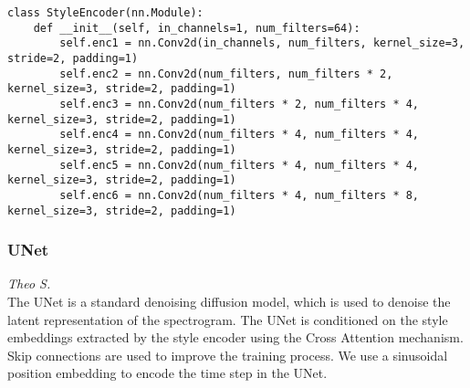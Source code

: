 \begin{lstlisting}[basicstyle=\tiny]
class StyleEncoder(nn.Module):
    def __init__(self, in_channels=1, num_filters=64):
        self.enc1 = nn.Conv2d(in_channels, num_filters, kernel_size=3, stride=2, padding=1)
        self.enc2 = nn.Conv2d(num_filters, num_filters * 2, kernel_size=3, stride=2, padding=1)
        self.enc3 = nn.Conv2d(num_filters * 2, num_filters * 4, kernel_size=3, stride=2, padding=1)
        self.enc4 = nn.Conv2d(num_filters * 4, num_filters * 4, kernel_size=3, stride=2, padding=1)
        self.enc5 = nn.Conv2d(num_filters * 4, num_filters * 4, kernel_size=3, stride=2, padding=1)
        self.enc6 = nn.Conv2d(num_filters * 4, num_filters * 8, kernel_size=3, stride=2, padding=1)
\end{lstlisting}

\subsubsection{UNet}
\textit{Theo S.}\\
The UNet is a standard denoising diffusion model, which is used to denoise the latent representation of the spectrogram. The UNet is conditioned on the style embeddings extracted by the style encoder using the Cross Attention mechanism. Skip connections are used to improve the training process. We use a sinusoidal position embedding to encode the time step in the UNet.


\newpage

